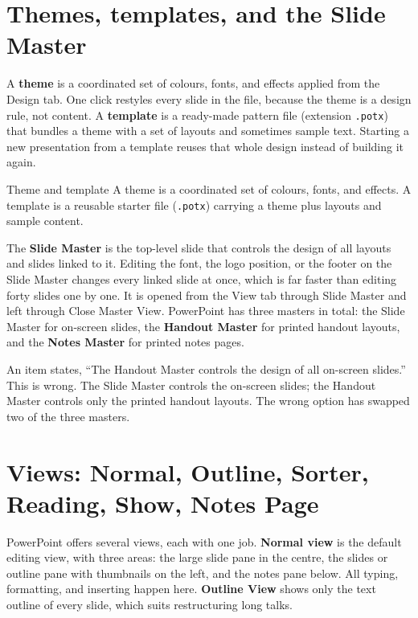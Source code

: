 \section{Themes, templates, and the Slide Master}
A \textbf{theme} is a coordinated set of colours, fonts, and effects applied
from the Design tab. One click restyles every slide in the file, because the
theme is a design rule, not content. A \textbf{template} is a ready-made
pattern file (extension \texttt{.potx}) that bundles a theme with a set of
layouts and sometimes sample text. Starting a new presentation from a template
reuses that whole design instead of building it again.

\begin{definitionbox}{Theme and template}
A theme is a coordinated set of colours, fonts, and effects. A template is a
reusable starter file (\texttt{.potx}) carrying a theme plus layouts and
sample content.
\end{definitionbox}

The \textbf{Slide Master} is the top-level slide that controls the design of
all layouts and slides linked to it. Editing the font, the logo position, or
the footer on the Slide Master changes every linked slide at once, which is
far faster than editing forty slides one by one. It is opened from the View
tab through Slide Master and left through Close Master View. PowerPoint has
three masters in total: the Slide Master for on-screen slides, the
\textbf{Handout Master} for printed handout layouts, and the \textbf{Notes
Master} for printed notes pages.

\begin{example}
An item states, ``The Handout Master controls the design of all on-screen
slides.'' This is wrong. The Slide Master controls the on-screen slides; the
Handout Master controls only the printed handout layouts. The wrong option has
swapped two of the three masters.
\end{example}

\section{Views: Normal, Outline, Sorter, Reading, Show, Notes Page}
PowerPoint offers several views, each with one job. \textbf{Normal view} is
the default editing view, with three areas: the large slide pane in the
centre, the slides or outline pane with thumbnails on the left, and the notes
pane below. All typing, formatting, and inserting happen here. \textbf{Outline
View} shows only the text outline of every slide, which suits restructuring
long talks.

